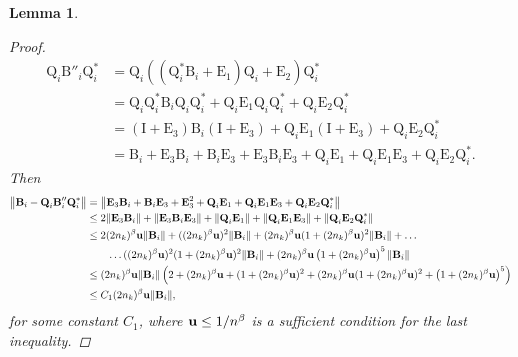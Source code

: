 \documentclass{article}
\newcommand{\lnorm}{\left\|}
\newcommand{\rnorm}{\right\|}
\newcommand{\lpar}{\left(}
\newcommand{\rpar}{\right)}
\newtheorem{lemma}{Lemma}[section]
\newcommand\matB{\boldsymbol{\mathrm{B}}}
\newcommand\matE{\boldsymbol{\mathrm{E}}}
\newcommand\matI{\boldsymbol{\mathrm{I}}}
\newcommand\matQ{\boldsymbol{\mathrm{Q}}}
\newcommand{\umach}{\textbf{\textup{u}}}
\newcommand{\cmm}{\beta}
\begin{document}
\begin{lemma}
\begin{proof}
        \begin{align*}
            \matQ_i\matB''_i\matQ_i^* 
            &=
            \matQ_i\lpar  (\matQ_i^*\matB_i+\matE_1)\matQ_i+\matE_2 \rpar \matQ_i^*
            \\
            &=
            \matQ_i\matQ_i^*\matB_i\matQ_i\matQ_i^*+\matQ_i\matE_1\matQ_i\matQ_i^*+\matQ_i\matE_2\matQ_i^*
            \\
            &=
            (\matI+\matE_3)\matB_i(\matI+\matE_3) + \matQ_i\matE_1(\matI+\matE_3) + \matQ_i\matE_2\matQ_i^*
            \\
            &=
            \matB_i+\matE_3\matB_i + \matB_i\matE_3 + \matE_3\matB_i\matE_3 + \matQ_i\matE_1+\matQ_i\matE_1\matE_3 + \matQ_i\matE_2\matQ_i^*.
        \end{align*}
        Then
        \begin{align*}
            \lnorm 
                \matB_i - \matQ_i\matB''_i\matQ_i^*
            \rnorm
            &=
            \lnorm 
                \matE_3\matB_i + \matB_i\matE_3 + \matE_3^2 + \matQ_i\matE_1+\matQ_i\matE_1\matE_3 + \matQ_i\matE_2\matQ_i^*
            \rnorm
            \\
            &\leq
            2\|\matE_3\matB_i\|
            + 
            \|\matE_3\matB_i\matE_3\|
            + 
            \|\matQ_i\matE_1\|
            +
            \|\matQ_i\matE_1\matE_3\|
            + 
            \|\matQ_i\matE_2\matQ_i^*\|
            \\
            &\leq
            2(2n_k)^{\cmm}\umach\|\matB_i\|
            + 
            ((2n_k)^{\cmm}\umach)^2\|\matB_i\|
            + 
            (2n_k)^{\cmm}\umach (1+(2n_k)^{\cmm}\umach)^2 \|\matB_i\|
            +\ldots
            \\
            &\quad\quad
            \ldots
            ((2n_k)^{\cmm}\umach)^2 (1+(2n_k)^{\cmm}\umach)^2 \|\matB_i\|
            + 
            (2n_k)^{\cmm}\umach
            \lpar
                1+(2n_k)^{\cmm}\umach
            \rpar^5
            \|\matB_i\|
            \\
            &\leq
            (2n_k)^{\cmm}\umach
            \|\matB_i\|
            \lpar
                2
                + 
                (2n_k)^{\cmm}\umach
                + 
                (1+(2n_k)^{\cmm}\umach)^2
                +
                (2n_k)^{\cmm}\umach (1+(2n_k)^{\cmm}\umach)^2
                + 
                \lpar
                    1+(2n_k)^{\cmm}\umach
                \rpar^5
            \rpar
            \\
            &\leq C_1(2n_k)^{\cmm}\umach \|\matB_i\|,
        \end{align*}
        for some constant $C_1$, where $\umach \leq 1/n^{\cmm}$ is a sufficient condition for the last inequality.
    

\end{proof}
\end{lemma}
\end{document}
